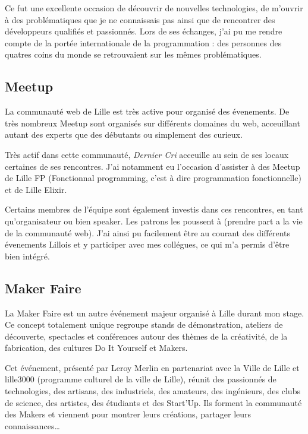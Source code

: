 Ce fut une excellente occasion de découvrir de nouvelles technologies,
de m'ouvrir à des problématiques que je ne connaissais pas ainsi que de
rencontrer des développeurs qualifiés et passionnés. Lors de ses
échanges, j'ai pu me rendre compte de la portée internationale de la
programmation : des personnes des quatres coins du monde se retrouvaient
sur les mêmes problématiques.

\bigskip

\subsection{Meetup}\label{meetup}

\bigskip

La communauté web de Lille est très active pour organisé des évenements.
De très nombreux Meetup sont organisés sur différents domaines du web,
acceuillant autant des experts que des débutants ou simplement des
curieux.

\bigskip

Très actif dans cette communauté, \emph{Dernier Cri} acceuille au sein
de ses locaux certaines de ses rencontres. J'ai notamment eu l'occasion
d'assister à des Meetup de Lille FP (Fonctionnal programming, c'est à
dire programmation fonctionnelle) et de Lille Elixir.

\bigskip

Certains membres de l'équipe sont également investis dans ces
rencontres, en tant qu'organisateur ou bien speaker. Les patrons les
poussent à (prendre part a la vie de la communauté web). J'ai ainsi pu
facilement être au courant des différents évenements Lillois et y
participer avec mes collégues, ce qui m'a permis d'être bien intégré.

\bigskip

\subsection{Maker Faire}\label{maker-faire}

\bigskip

La Maker Faire est un autre événement majeur organisé à Lille durant mon
stage. Ce concept totalement unique regroupe stands de démonstration,
ateliers de découverte, spectacles et conférences autour des thèmes de
la créativité, de la fabrication, des cultures Do It Yourself et Makers.

\bigskip

Cet événement, présenté par Leroy Merlin en partenariat avec la Ville de
Lille et lille3000 (programme culturel de la ville de Lille), réunit des
passionnés de technologies, des artisans, des industriels, des amateurs,
des ingénieurs, des clubs de science, des artistes, des étudiants et des
Start'Up. Ils forment la communauté des Makers et viennent pour montrer
leurs créations, partager leurs connaissances\ldots{}


